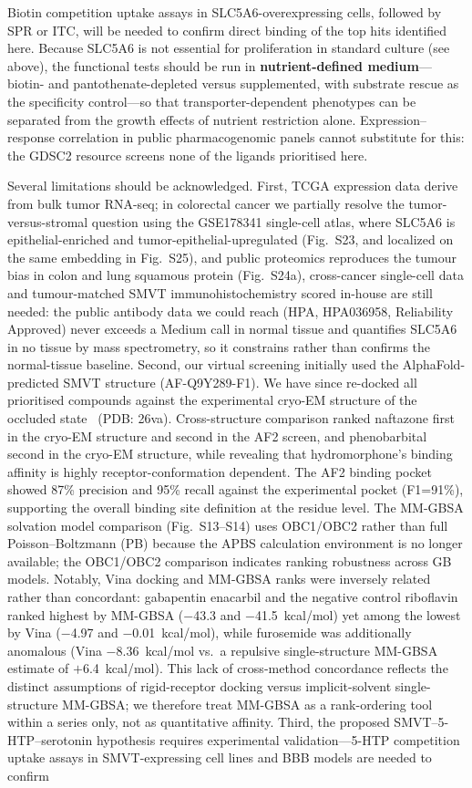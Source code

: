 \documentclass[pdflatex,sn-nature]{sn-jnl}
\begin{document}
Biotin competition uptake assays in SLC5A6-overexpressing cells, followed by SPR or ITC, will be needed to confirm direct binding of the top hits identified here. Because SLC5A6 is not essential for proliferation in standard culture (see above), the functional tests should be run in \textbf{nutrient-defined medium}---biotin- and pantothenate-depleted versus supplemented, with substrate rescue as the specificity control---so that transporter-dependent phenotypes can be separated from the growth effects of nutrient restriction alone. Expression--response correlation in public pharmacogenomic panels cannot substitute for this: the GDSC2 resource screens none of the ligands prioritised here.

\noindent Several limitations should be acknowledged. First, TCGA expression data derive from bulk tumor RNA-seq; in colorectal cancer we partially resolve the tumor-versus-stromal question using the GSE178341 single-cell atlas, where SLC5A6 is epithelial-enriched and tumor-epithelial-upregulated (Fig.~S23, and localized on the same embedding in Fig.~S25), and public proteomics reproduces the tumour bias in colon and lung squamous protein (Fig.~S24a), cross-cancer single-cell data and tumour-matched SMVT immunohistochemistry scored in-house are still needed: the public antibody data we could reach (HPA, HPA036958, Reliability Approved) never exceeds a Medium call in normal tissue and quantifies SLC5A6 in no tissue by mass spectrometry, so it constrains rather than confirms the normal-tissue baseline. Second, our virtual screening initially used the AlphaFold-predicted SMVT structure (AF-Q9Y289-F1). We have since re-docked all prioritised compounds against the experimental cryo-EM structure of the occluded state~\cite{zhen2026} (PDB: 26va). Cross-structure comparison ranked naftazone first in the cryo-EM structure and second in the AF2 screen, and phenobarbital second in the cryo-EM structure, while revealing that hydromorphone's binding affinity is highly receptor-conformation dependent. The AF2 binding pocket showed 87\% precision and 95\% recall against the experimental pocket (F1=91\%), supporting the overall binding site definition at the residue level. The MM-GBSA solvation model comparison (Fig.~S13--S14) uses OBC1/OBC2 rather than full Poisson--Boltzmann (PB) because the APBS calculation environment is no longer available; the OBC1/OBC2 comparison indicates ranking robustness across GB models. Notably, Vina docking and MM-GBSA ranks were inversely related rather than concordant: gabapentin enacarbil and the negative control riboflavin ranked highest by MM-GBSA ($-$43.3 and $-$41.5~kcal/mol) yet among the lowest by Vina ($-$4.97 and $-$0.01~kcal/mol), while furosemide was additionally anomalous (Vina $-$8.36~kcal/mol vs.\ a repulsive single-structure MM-GBSA estimate of $+$6.4~kcal/mol). This lack of cross-method concordance reflects the distinct assumptions of rigid-receptor docking versus implicit-solvent single-structure MM-GBSA; we therefore treat MM-GBSA as a rank-ordering tool within a series only, not as quantitative affinity. Third, the proposed SMVT--5-HTP--serotonin hypothesis requires experimental validation---5-HTP competition uptake assays in SMVT-expressing cell lines and BBB models are needed to confirm 
\end{document}
